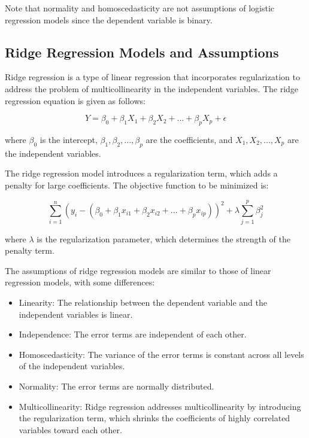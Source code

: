 \documentclass{article}
\begin{document}
Note that normality and homoscedasticity are not assumptions of logistic regression models since the dependent variable is binary.

\subsection{Ridge Regression Models and Assumptions}
Ridge regression is a type of linear regression that incorporates regularization to address the problem of multicollinearity in the independent variables. The ridge regression equation is given as follows:

\begin{equation}
Y = \beta_0 + \beta_1X_1 + \beta_2X_2 + ... + \beta_pX_p + \epsilon
\end{equation}

where $\beta_0$ is the intercept, $\beta_1, \beta_2, ..., \beta_p$ are the coefficients, and $X_1, X_2, ..., X_p$ are the independent variables.

The ridge regression model introduces a regularization term, which adds a penalty for large coefficients. The objective function to be minimized is:

\begin{equation}
\sum_{i=1}^{n} (y_i - (\beta_0 + \beta_1x_{i1} + \beta_2x_{i2} + ... + \beta_px_{ip}))^2 + \lambda\sum_{j=1}^{p} \beta_j^2
\end{equation}

where $\lambda$ is the regularization parameter, which determines the strength of the penalty term.

The assumptions of ridge regression models are similar to those of linear regression models, with some differences:

\begin{itemize}
\item Linearity: The relationship between the dependent variable and the independent variables is linear.
\item Independence: The error terms are independent of each other.
\item Homoscedasticity: The variance of the error terms is constant across all levels of the independent variables.
\item Normality: The error terms are normally distributed.
\item Multicollinearity: Ridge regression addresses multicollinearity by introducing the regularization term, which shrinks the coefficients of highly correlated variables toward each other.
\end{itemize}
\end{document}
